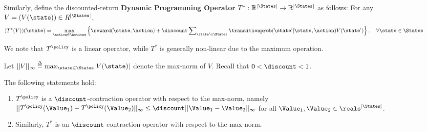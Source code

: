 Similarly, define the discounted-return \textbf{Dynamic Programming
Operator}  $T^*:\mathbb R^{|\States|} \to \mathbb R^{|\States|}$ as
follows: For any $V=(V(\state))\in R^{|\States|}$,
\[(T_{}^*(V))(\state) = \mathop {\max }\limits_{\action \in \Actions} \left\{ {\reward(\state,\action) + \discount \sum\nolimits_{\state' \in \States} {\transitionprob(\state'|\state,\action)V(\state')} } \right\},\quad \forall \state \in \States\]

We note that $T_{}^\policy $ is a linear operator, while $T_{}^*$ is
generally non-linear due to the maximum operation.

Let $||V|{|_\infty } \buildrel \Delta \over = {\max _{\state \in
\States}}|V(\state)|$ denote the max-norm of $V$.  Recall that $0 <
\discount < 1$.

\begin{theorem}
\label{thm:DP_op}
%
The following statements hold:
\begin{enumerate}
  \item $T_{}^\policy $ is a $\discount$-contraction operator with respect to the max-norm,  namely
                      $||T_{}^\policy ({\Value_1}) - T_{}^\policy ({\Value_2})|{|_\infty } \le \discount ||{\Value_1} - {\Value_2}|{|_\infty }$ for all $\Value_1,\Value_2\in \reals^{|\States|}$.
  \item Similarly, $T_{}^*$ is an $\discount$-contraction operator with respect to the max-norm.
\end{enumerate}
\end{theorem}

